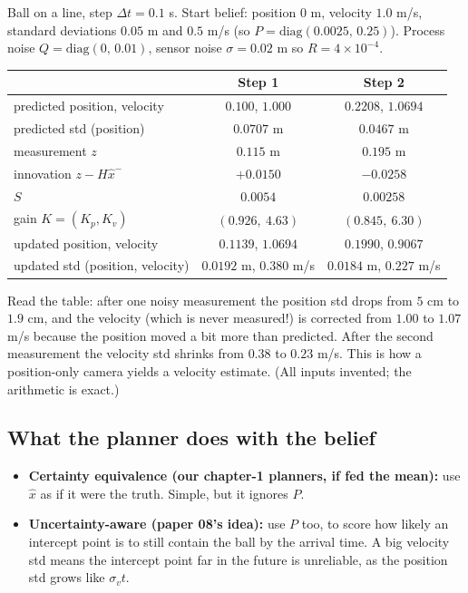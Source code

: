 \documentclass[11pt,a4paper]{article}
\begin{document}
\begin{toy}
Ball on a line, step $\Delta t=0.1$ s. Start belief: position $0$ m, velocity $1.0$ m/s,
standard deviations $0.05$ m and $0.5$ m/s (so $P=\mathrm{diag}(0.0025,\,0.25)$). Process noise
$Q=\mathrm{diag}(0,\,0.01)$, sensor noise $\sigma=0.02$ m so $R=4\times10^{-4}$.
\begin{center}
\renewcommand{\arraystretch}{1.2}
\begin{tabular}{lcc}
\toprule
 & Step 1 & Step 2 \\
\midrule
predicted position, velocity & $0.100$, $1.000$ & $0.2208$, $1.0694$ \\
predicted std (position) & $0.0707$ m & $0.0467$ m \\
measurement $z$ & $0.115$ m & $0.195$ m \\
innovation $z-H\hat x^-$ & $+0.0150$ & $-0.0258$ \\
$S$ & $0.0054$ & $0.00258$ \\
gain $K=(K_p,K_v)$ & $(0.926,\ 4.63)$ & $(0.845,\ 6.30)$ \\
updated position, velocity & $0.1139$, $1.0694$ & $0.1990$, $0.9067$ \\
updated std (position, velocity) & $0.0192$ m, $0.380$ m/s & $0.0184$ m, $0.227$ m/s \\
\bottomrule
\end{tabular}
\end{center}
Read the table: after one noisy measurement the position std drops from $5$ cm to $1.9$ cm, and the
velocity (which is never measured!) is corrected from $1.00$ to $1.07$ m/s because the position
moved a bit more than predicted. After the second measurement the velocity std shrinks from
$0.38$ to $0.23$ m/s. This is how a position-only camera yields a velocity estimate. (All inputs
invented; the arithmetic is exact.)
\end{toy}

\subsection{What the planner does with the belief}
\begin{itemize}
\item \textbf{Certainty equivalence (our chapter-1 planners, if fed the mean):} use $\hat x$ as if
it were the truth. Simple, but it ignores $P$.
\item \textbf{Uncertainty-aware (paper 08's idea):} use $P$ too, to score how likely an intercept
point is to still contain the ball by the arrival time. A big velocity std means the intercept
point far in the future is unreliable, as the position std grows like $\sigma_v t$.
\end{itemize}
\end{document}
